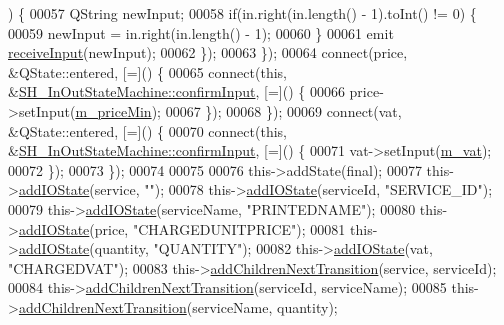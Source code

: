 \begin{DoxyCode}
{{      ) \{
00057             QString newInput;
00058             \textcolor{keywordflow}{if}(in.right(in.length() - 1).toInt() != 0) \{
00059                 newInput = in.right(in.length() - 1);
00060             \}
00061             emit \hyperlink{classSimpleHotel_1_1SH__InOutStateMachine_a17482446bbf0327e84feb5d6a1a612f0}{receiveInput}(newInput);
00062         \});
00063     \});
00064     connect(price, &QState::entered, [=]() \{
00065         connect(\textcolor{keyword}{this}, &\hyperlink{classSimpleHotel_1_1SH__InOutStateMachine_a949cdb448f813f201b6ca827d1c860e9}{SH\_InOutStateMachine::confirmInput}, [=]() \{
00066             price->setInput(\hyperlink{classSimpleHotel_1_1SH__ServiceCharging_a72f1c4a2c5ae6344b9e8a8dbd85f1029}{m\_priceMin});
00067         \});
00068     \});
00069     connect(vat, &QState::entered, [=]() \{
00070         connect(\textcolor{keyword}{this}, &\hyperlink{classSimpleHotel_1_1SH__InOutStateMachine_a949cdb448f813f201b6ca827d1c860e9}{SH\_InOutStateMachine::confirmInput}, [=]() \{
00071             vat->setInput(\hyperlink{classSimpleHotel_1_1SH__ServiceCharging_a4cb1fa10bbf8365734f68da006b887af}{m\_vat});
00072         \});
00073     \});
00074 
00075 
00076     this->addState(\textcolor{keyword}{final});
00077     this->\hyperlink{classSimpleHotel_1_1SH__InOutStateMachine_a07ae9f1f74a9a41b26e77a014679a33e}{addIOState}(service, \textcolor{stringliteral}{""});
00078     this->\hyperlink{classSimpleHotel_1_1SH__InOutStateMachine_a07ae9f1f74a9a41b26e77a014679a33e}{addIOState}(serviceId, \textcolor{stringliteral}{"SERVICE\_ID"});
00079     this->\hyperlink{classSimpleHotel_1_1SH__InOutStateMachine_a07ae9f1f74a9a41b26e77a014679a33e}{addIOState}(serviceName, \textcolor{stringliteral}{"PRINTEDNAME"});
00080     this->\hyperlink{classSimpleHotel_1_1SH__InOutStateMachine_a07ae9f1f74a9a41b26e77a014679a33e}{addIOState}(price, \textcolor{stringliteral}{"CHARGEDUNITPRICE"});
00081     this->\hyperlink{classSimpleHotel_1_1SH__InOutStateMachine_a07ae9f1f74a9a41b26e77a014679a33e}{addIOState}(quantity, \textcolor{stringliteral}{"QUANTITY"});
00082     this->\hyperlink{classSimpleHotel_1_1SH__InOutStateMachine_a07ae9f1f74a9a41b26e77a014679a33e}{addIOState}(vat, \textcolor{stringliteral}{"CHARGEDVAT"});
00083     this->\hyperlink{classSimpleHotel_1_1SH__LoopingInOutStateMachine_a2ac2ff43d97fd1b12e1b30d6818f33e4}{addChildrenNextTransition}(service, serviceId);
00084     this->\hyperlink{classSimpleHotel_1_1SH__LoopingInOutStateMachine_a2ac2ff43d97fd1b12e1b30d6818f33e4}{addChildrenNextTransition}(serviceId, serviceName);
00085     this->\hyperlink{classSimpleHotel_1_1SH__LoopingInOutStateMachine_a2ac2ff43d97fd1b12e1b30d6818f33e4}{addChildrenNextTransition}(serviceName, quantity);
}}
\end{DoxyCode}
